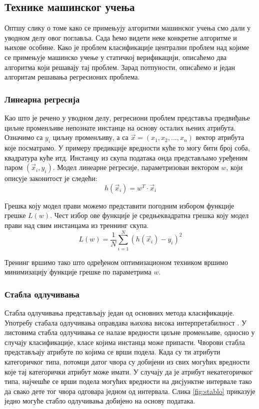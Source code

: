 \documentclass[a4paper]{article}
\begin{document}
{\subsection{Технике машинског учења}
Оптшу слику о томе како се примењују алгоритми машинског учења смо дали у уводном делу овог поглавља. Сада ћемо видети неке конкретне алгоритме и њихове особине. Како је проблем класификације централни проблем над којиме се примењује машинско учење у статичкој верификацији, описаћемо два алгоритма који решавају тај проблем. Зарад потпуности, описаћемо и један алгоритам решавања регресионих проблема.


\subsubsection*{Линеарна регресија}
Као што је речено у уводном делу, регресиони проблем представља предвиђање циљне променљиве непознате инстанце на основу осталих њених атрибута. Означимо са $y_i$ циљну променљиву, а са $\vec{x} = (x_1, x_2, ..., x_n)$ вектор атрибута које посматрамо. У примеру предикције вредности куће то могу бити број соба, квадратура куће итд. Инстанцу из скупа података онда представљамо уређеним паром $(\vec{x}_i, y_i)$. Модел линеарне регресије, параметризован вектором $w$, који описује законитост је следећи:
\begin{equation}
	h(\vec{x}_i) = w^T \cdot \vec{x}_i
\end{equation}


Грешка коју модел прави можемо представити погодним избором функције грешке $L(w)$. Чест избор ове функције је средњеквадратна грешка коју модел прави над свим инстанцама из треннинг скупа.
\begin{equation}
L(w) = \frac{1}{N}\sum \limits_{i=1}^{N} (h(\vec{x}_i) - y_i)^2
\end{equation}


Тренинг вршимо тако што одређеном оптимизационом техником вршимо минимизацију функције грешке по параметрима $w$.


\subsubsection*{Стабла одлучивања}
Стабла одлучивања представљају један од основних метода класификације. Употребу стабала одлучивања оправдава њихова висока интерпретабилност \cite{dct-survey}. У листовима стабла одлучивања се налазе вредности циљне променљиве, односно у случају класификације, класе којима инстанца може припасти. Чворови стабла представљају атрибуте по којима се врши подела. Када су ти атрибути категоричког типа, потомци датог чвора су добијени из свих могућих вредности које тај категорички атрибут може имати. У случају да је атрибут некатегоричког типа, најчешће се врши подела могућих вредности на дисјунктне интервале тако да свако дете тог чвора одговара једном од интервала. Слика \ref{fig:stablo} приказује једно могуће стабло одлучивања добијено на основу података.

}
\end{document}
